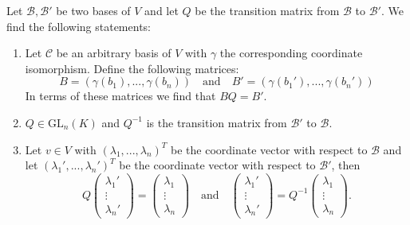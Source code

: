         \begin{property}\label{linalgebra:theorem:transition_matrix}
		Let $\mathcal{B}, \mathcal{B}'$ be two bases of $V$ and let $Q$ be the transition matrix from $\mathcal{B}$ to $\mathcal{B}'$. We find the following statements:
	        \begin{enumerate}
			\item Let $\mathcal{C}$ be an arbitrary basis of $V$ with $\gamma$ the corresponding coordinate isomorphism. Define the following matrices:
        	        	\[
        	        		B=(\gamma(b_1), ..., \gamma(b_n))\quad\text{and}\quad B'=(\gamma(b_1'), ..., \gamma(b_n'))
        	        	\]
		                In terms of these matrices we find that $BQ = B'$.
			\item $Q\in\text{GL}_n(K)$ and $Q^{-1}$ is the transition matrix from $\mathcal{B}'$ to $\mathcal{B}$.
                	\item Let $v\in V$ with $(\lambda_1, ..., \lambda_n)^T$ be the coordinate vector with respect to $\mathcal{B}$ and let $(\lambda_1', ..., \lambda_n')^T$ be the coordinate vector with respect to $\mathcal{B}'$, then
                	\[
		                Q\left(
				\begin{array}{c}
					\lambda_1'\\
                			\vdots\\
			        	\lambda_n'
				\end{array}
                        	\right)
                        	=
		                \left(
                		\begin{array}{c}
					\lambda_1\\
                			\vdots\\
			        	\lambda_n
				\end{array}
                        	\right)
				\quad\text{and}\quad
                        	\left(
                        	\begin{array}{c}
					\lambda_1'\\
                        		\vdots\\
			        	\lambda_n'
				\end{array}
		                \right)
                	        =
                	        Q^{-1}\left(
                	        \begin{array}{c}
					\lambda_1\\
                		        \vdots\\
			                \lambda_n
				\end{array}
                        	\right).
			\]
		\end{enumerate}
	\end{property}

